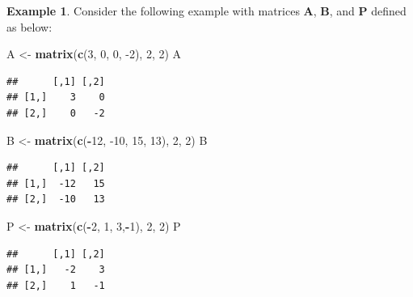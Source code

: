 \documentclass[
]{book}
\newenvironment{Shaded}{\begin{snugshade}}{\end{snugshade}}
\newcommand{\DecValTok}[1]{\textcolor[rgb]{0.00,0.00,0.81}{#1}}
\newcommand{\KeywordTok}[1]{\textcolor[rgb]{0.13,0.29,0.53}{\textbf{#1}}}
\newcommand{\NormalTok}[1]{#1}
\newcommand{\OperatorTok}[1]{\textcolor[rgb]{0.81,0.36,0.00}{\textbf{#1}}}
\newcommand{\StringTok}[1]{\textcolor[rgb]{0.31,0.60,0.02}{#1}}
\theoremstyle{definition}
\theoremstyle{definition}
\newtheorem{example}{Example}[chapter]
\theoremstyle{definition}
\theoremstyle{definition}
\theoremstyle{remark}
\begin{document}
\begin{example}

Consider the following example with matrices \(\mathbf{A}\), \(\mathbf{B}\), and \(\mathbf{P}\) defined as below:

\begin{Shaded}
\begin{Highlighting}[]
\NormalTok{A <-}\StringTok{ }\KeywordTok{matrix}\NormalTok{(}\KeywordTok{c}\NormalTok{(}\DecValTok{3}\NormalTok{, }\DecValTok{0}\NormalTok{, }\DecValTok{0}\NormalTok{, }\DecValTok{-2}\NormalTok{), }\DecValTok{2}\NormalTok{, }\DecValTok{2}\NormalTok{)}
\NormalTok{A}
\end{Highlighting}
\end{Shaded}

\begin{verbatim}
##      [,1] [,2]
## [1,]    3    0
## [2,]    0   -2
\end{verbatim}

\begin{Shaded}
\begin{Highlighting}[]
\NormalTok{B <-}\StringTok{ }\KeywordTok{matrix}\NormalTok{(}\KeywordTok{c}\NormalTok{(}\OperatorTok{-}\DecValTok{12}\NormalTok{, }\DecValTok{-10}\NormalTok{, }\DecValTok{15}\NormalTok{, }\DecValTok{13}\NormalTok{), }\DecValTok{2}\NormalTok{, }\DecValTok{2}\NormalTok{)}
\NormalTok{B}
\end{Highlighting}
\end{Shaded}

\begin{verbatim}
##      [,1] [,2]
## [1,]  -12   15
## [2,]  -10   13
\end{verbatim}

\begin{Shaded}
\begin{Highlighting}[]
\NormalTok{P <-}\StringTok{ }\KeywordTok{matrix}\NormalTok{(}\KeywordTok{c}\NormalTok{(}\OperatorTok{-}\DecValTok{2}\NormalTok{, }\DecValTok{1}\NormalTok{, }\DecValTok{3}\NormalTok{,}\OperatorTok{-}\DecValTok{1}\NormalTok{), }\DecValTok{2}\NormalTok{, }\DecValTok{2}\NormalTok{)}
\NormalTok{P}
\end{Highlighting}
\end{Shaded}

\begin{verbatim}
##      [,1] [,2]
## [1,]   -2    3
## [2,]    1   -1
\end{verbatim}

\begin{Shaded}
\end{Shaded}


\end{example}
\end{document}
